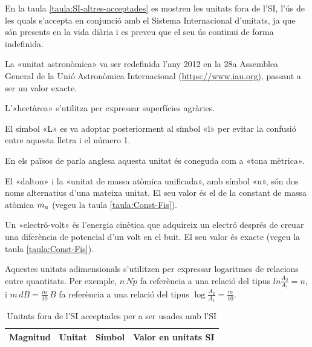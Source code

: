 En la taula \vref{taula:SI-altres-acceptades} es mostren les unitats fora de l'SI, l'ús de les quals s'accepta en conjunció amb el Sistema Internacional d'unitats, ja que són presents en la vida diària i es preveu que el seu ús continuï de forma indefinida.

\begin{ThreePartTable}
\begin{TableNotes}
    \item[\color{blue}(a)] {\footnotesize La «unitat astronòmica» va ser redefinida l'any 2012 en la 28a Assemblea General de la Unió Astronòmica Internacional (\href{https://www.iau.org/}{https:/\!\!/www.iau.org}), passant a ser un valor exacte.}
    \item[\color{blue}(b)] {\footnotesize L'«hectàrea» s'utilitza per expressar superfícies agràries.}
    \item[\color{blue}(c)] {\footnotesize El símbol «L» es va adoptar posteriorment al símbol «l» per evitar la  confusió entre aquesta lletra  i  el número 1.}
    \item[\color{blue}(d)] {\footnotesize En els països de parla anglesa aquesta unitat és coneguda com a «tona mètrica».}
    \item[\color{blue}(e)] {\footnotesize El «dalton» i la «unitat de massa atòmica unificada», amb símbol «u»,  són dos noms alternatius d'una mateixa unitat. El seu valor és el de la constant de massa atòmica  $m_\mathrm{u}$ (vegeu la taula \vref{taula:Const-Fis}).}
    \item[\color{blue}(f)] {\footnotesize Un «electró-volt» és l'energia cinètica que adquireix un electró després de creuar una diferència de potencial d'un volt en el buit. El seu valor és exacte (vegeu la taula \vref{taula:Const-Fis}).}
    \item[\color{blue}(g)] {\footnotesize Aquestes unitats adimensionals s'utilitzen per expressar logaritmes de relacions entre quantitats. Per exemple, $n\unit{\,Np}$ fa referència a una relació del tipus $ln\frac{A_2}{A_1}= n$, i  $ m\unit{\,dB} =\frac{m}{10}\unit{\,B}$  fa referència a una relació del tipus $\log\frac{A_2}{A_1} =\frac{m}{10}$.}
\end{TableNotes}
\begin{longtable}[h]{llcl}
   \caption{\label{taula:SI-altres-acceptades} Unitats fora de l'SI acceptades per a ser usades amb l'SI  }\\
   \toprule[1pt]
    Magnitud & Unitat &  Símbol & Valor en unitats SI\\
   \midrule
   \endfirsthead

\end{longtable}
\end{ThreePartTable}
